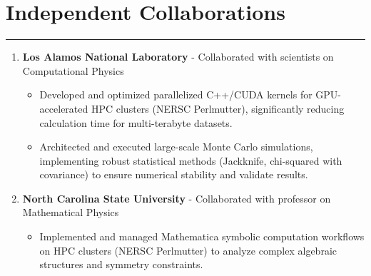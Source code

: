 \documentclass[11pt]{article}
\begin{document}
\section*{Independent Collaborations}
\hrule
\vspace{-0.3em}
\begin{enumerate}
    \item \textbf{Los Alamos National Laboratory} - Collaborated with scientists on Computational Physics
    \vspace{-0.7em}
\begin{itemize}
    \item Developed and optimized parallelized C++/CUDA kernels for GPU-accelerated HPC clusters (NERSC Perlmutter), significantly reducing calculation time for multi-terabyte datasets.
    \vspace{-0.5em}
    \item Architected and executed large-scale Monte Carlo simulations, implementing robust statistical methods (Jackknife, chi-squared with covariance) to ensure numerical stability and validate results.
\end{itemize}

\item  \textbf{North Carolina State University} - Collaborated with professor on Mathematical Physics
\vspace{-0.5em}
\begin{itemize}
    \item Implemented and managed Mathematica symbolic computation workflows on HPC clusters (NERSC Perlmutter) to analyze complex algebraic structures and symmetry constraints.
\end{itemize}

\end{enumerate}

\vspace{0.5em}
\end{document}
